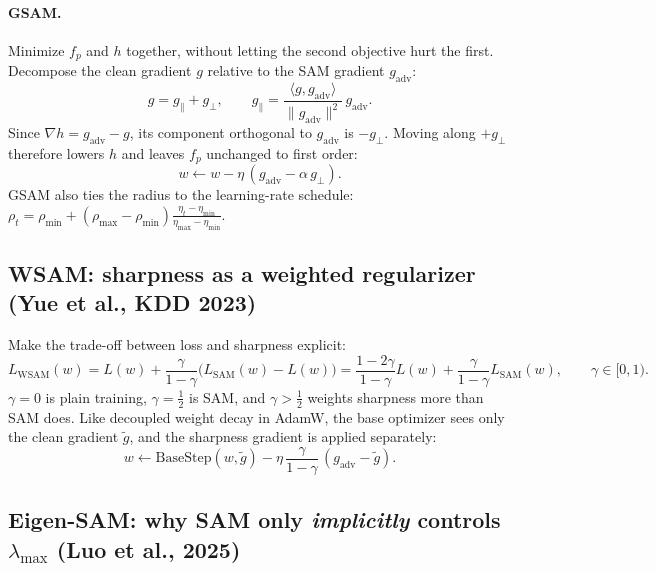 \documentclass[11pt]{article}
\newcommand{\lmax}{\lambda_{\max}}
\newcommand{\gp}{g_{\mathrm{adv}}}
\theoremstyle{plain}
\begin{document}
\paragraph{GSAM.} Minimize $f_p$ and $h$ together, without letting the second objective hurt the first. Decompose the clean gradient $g$ relative to the SAM gradient $\gp$:
\begin{equation}
  g = g_\parallel + g_\perp, \qquad g_\parallel = \frac{\langle g, \gp\rangle}{\|\gp\|^2}\,\gp .
\end{equation}
Since $\nabla h = \gp - g$, its component orthogonal to $\gp$ is $-g_\perp$. Moving along $+g_\perp$ therefore lowers $h$ and leaves $f_p$ unchanged to first order:
\begin{equation}
  w \leftarrow w - \eta\,(\gp - \alpha\, g_\perp).
\end{equation}
GSAM also ties the radius to the learning-rate schedule: $\rho_t = \rho_{\min} + (\rho_{\max}-\rho_{\min})\frac{\eta_t - \eta_{\min}}{\eta_{\max}-\eta_{\min}}$.

\subsection{WSAM: sharpness as a weighted regularizer (Yue et al., KDD 2023)}

Make the trade-off between loss and sharpness explicit:
\begin{equation}
  L_{\mathrm{WSAM}}(w) = L(w) + \frac{\gamma}{1-\gamma}\big(L_{\mathrm{SAM}}(w) - L(w)\big)
                      = \frac{1-2\gamma}{1-\gamma}L(w) + \frac{\gamma}{1-\gamma}L_{\mathrm{SAM}}(w), \qquad \gamma\in[0,1).
\end{equation}
$\gamma = 0$ is plain training, $\gamma = \frac12$ is SAM, and $\gamma > \frac12$ weights sharpness more than SAM does. Like decoupled weight decay in AdamW,
the base optimizer sees only the clean gradient $\tilde g$, and the sharpness gradient is applied separately:
\begin{equation}
  w \leftarrow \mathrm{BaseStep}(w, \tilde g) - \eta\,\frac{\gamma}{1-\gamma}\,(\gp - \tilde g).
\end{equation}

\subsection{Eigen-SAM: why SAM only \emph{implicitly} controls $\lmax$ (Luo et al., 2025)}
\end{document}
